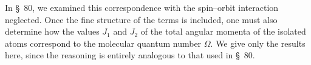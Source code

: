 In \S~80, we examined this correspondence with the spin--orbit interaction neglected. Once the fine structure of the terms is included, one must also determine how the values $J_1$ and $J_2$ of the total angular momenta of the isolated atoms
correspond to the molecular quantum number $\Omega$. We give only the results here, since the reasoning is entirely analogous to that used in \S~80.
